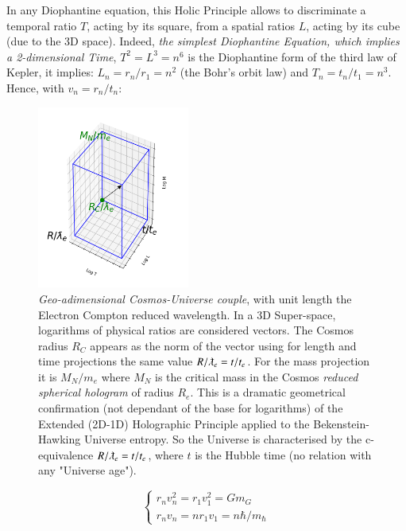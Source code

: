 \documentclass[a4paper,9pt]{article}
\begin{document}

In any Diophantine equation, this Holic Principle allows to discriminate a temporal ratio $T$, acting by its square, from a spatial ratios $L$, acting by its cube (due to the 3D space). Indeed, \textit {the simplest Diophantine Equation, which implies a 2-dimensional Time}, $T^2 = L^3 = n^6$ is the Diophantine form of the third law of Kepler, it implies: $L_n = r_n /r_1 = n^2$ (the Bohr's orbit law) and $T_n = t_n/t_1 = n^3$. Hence, with $v_n = r_n/t_ n$:



\begin{figure}
\centering
\includegraphics[width=5cm,height=6cm]{./figure/triaxis.png}
\caption[Figure \ref{cuboid} MLT Adimensional cuboid]{\textit{Geo-adimensional Cosmos-Universe couple}, with unit length the Electron Compton reduced wavelength. In a 3D Super-space, logarithms of physical ratios are considered vectors. The Cosmos radius $ R_C$ appears as the norm of the vector using for length and time projections the same value $R/\lambdabar_e = t/t_e$. For the mass projection it is $M_N/m_e$ where $M_N$ is the critical mass in the Cosmos \textit{reduced spherical hologram} of radius $R_e$. This is a dramatic geometrical confirmation (not dependant of the base for logarithms) of the Extended (2D-1D) Holographic Principle applied to the Bekenstein-Hawking Universe entropy. So the Universe is characterised by the c-equivalence $R/\lambdabar_e = t/t_e$, where $t$ is the Hubble time (no relation with any "Universe age").} 
\label{cuboid}
\end{figure} 


 \begin{equation}\label{Eq11}
 \left\{
    \begin{array}{ll}
        r_nv_n^2 = r_1v_1^2 = Gm_G \\
        r_nv_n = nr_1v_1 = n \hbar/m_{\hbar}
    \end{array}
\right.
\end{equation}
\end{document}
